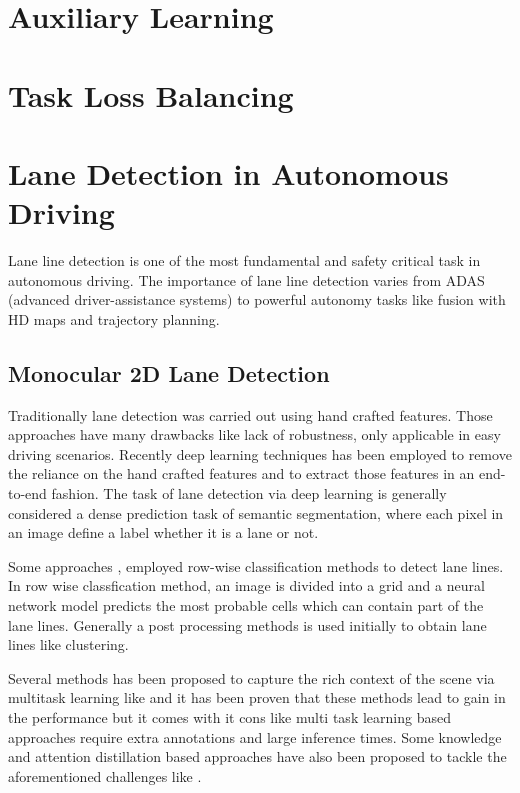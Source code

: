     \section{Auxiliary Learning}
    \section{Task Loss Balancing}
    \section{Lane Detection in Autonomous Driving}
    Lane line detection is one of the most fundamental and safety critical task in autonomous driving. The importance of lane line detection varies from ADAS (advanced driver-assistance systems) to powerful autonomy tasks like fusion with HD maps and trajectory planning.
        \subsection{Monocular 2D Lane Detection}
        Traditionally lane detection was carried out using hand crafted features. Those approaches have many drawbacks like lack of robustness, only applicable in easy driving scenarios. Recently deep learning techniques has been employed to remove the reliance on the hand crafted features and to extract those features in an end-to-end fashion. The task of lane detection via deep learning is generally considered a dense prediction task of semantic segmentation, where each pixel in an image define a label whether it is a lane or not.  %

Some approaches \cite{DBLP:journals/corr/abs-2005-08630}, \cite{DBLP:journals/corr/abs-2004-11757} employed row-wise classification methods to detect lane lines. In row wise classfication method, an image is divided into a grid and a neural network model predicts the most probable cells which can contain part of the lane lines. Generally a post processing methods is used initially to obtain lane lines like clustering.

Several methods has been proposed to capture the rich context of the scene via multitask learning like \cite{inbook} and it has been proven that these methods lead to gain in the performance but it comes with it cons like multi task learning based approaches require extra annotations and large inference times. Some knowledge and attention distillation based approaches have also been proposed to tackle the aforementioned challenges like \cite{DBLP:journals/corr/abs-1908-00821}. 

